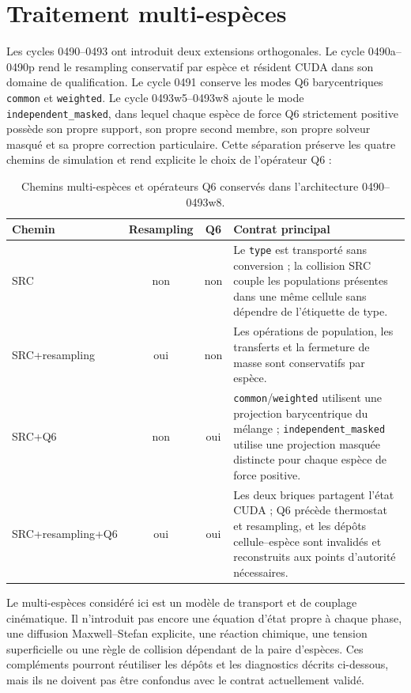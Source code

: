 \documentclass[11pt,a4paper]{article}
\begin{document}
\section{Traitement multi-espèces}

Les cycles 0490--0493 ont introduit deux extensions orthogonales. Le cycle 0490a--0490p rend le resampling conservatif par espèce et résident CUDA dans son domaine de qualification. Le cycle 0491 conserve les modes Q6 barycentriques \texttt{common} et \texttt{weighted}. Le cycle 0493w5--0493w8 ajoute le mode \texttt{independent\_masked}, dans lequel chaque espèce de force Q6 strictement positive possède son propre support, son propre second membre, son propre solveur masqué et sa propre correction particulaire. Cette séparation préserve les quatre chemins de simulation et rend explicite le choix de l'opérateur Q6 :

\begin{table}[htbp]
\centering
\small
\caption{Chemins multi-espèces et opérateurs Q6 conservés dans l'architecture 0490--0493w8.}
\begin{tabular}{@{}p{}ccp{}@{}}
\toprule
Chemin & Resampling & Q6 & Contrat principal \\
\midrule
SRC & non & non & Le \texttt{type} est transporté sans conversion ; la collision SRC couple les populations présentes dans une même cellule sans dépendre de l'étiquette de type. \\
SRC+resampling & oui & non & Les opérations de population, les transferts et la fermeture de masse sont conservatifs par espèce. \\
SRC+Q6 & non & oui & \texttt{common}/\texttt{weighted} utilisent une projection barycentrique du mélange ; \texttt{independent\_masked} utilise une projection masquée distincte pour chaque espèce de force positive. \\
SRC+resampling+Q6 & oui & oui & Les deux briques partagent l'état CUDA ; Q6 précède thermostat et resampling, et les dépôts cellule--espèce sont invalidés et reconstruits aux points d'autorité nécessaires. \\
\bottomrule
\end{tabular}
\end{table}

Le multi-espèces considéré ici est un modèle de transport et de couplage cinématique. Il n'introduit pas encore une équation d'état propre à chaque phase, une diffusion Maxwell--Stefan explicite, une réaction chimique, une tension superficielle ou une règle de collision dépendant de la paire d'espèces. Ces compléments pourront réutiliser les dépôts et les diagnostics décrits ci-dessous, mais ils ne doivent pas être confondus avec le contrat actuellement validé.
\end{document}
